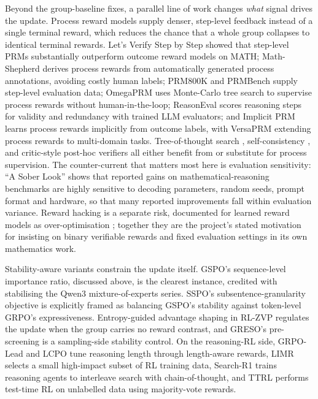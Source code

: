 \documentclass[12pt,a4paper]{report}
\begin{document}
Beyond the group-baseline fixes, a parallel line of work changes
\emph{what} signal drives the update. Process reward models supply
denser, step-level feedback instead of a single terminal reward, which
reduces the chance that a whole group collapses to identical terminal
rewards. Let's Verify Step by Step \citep{lightman2023lets} showed that
step-level PRMs substantially outperform outcome reward models on MATH;
Math-Shepherd \citep{wang2024mathshepherd} derives process rewards from
automatically generated process annotations, avoiding costly human
labels; PRM800K \citep{lightman2023lets} and PRMBench
\citep{song2025prmbench} supply step-level evaluation data; OmegaPRM
\citep{luo2024omegaprm} uses Monte-Carlo tree search to supervise
process rewards without human-in-the-loop; ReasonEval
\citep{xia2025reasoneval} scores reasoning steps for validity and
redundancy with trained LLM evaluators; and Implicit PRM
\citep{yuan2024implicitprm} learns process rewards implicitly from
outcome labels, with VersaPRM \citep{zeng2025versaprm} extending process
rewards to multi-domain tasks. Tree-of-thought search
\citep{yao2023tot}, self-consistency \citep{wang2023selfconsistency},
and critic-style post-hoc verifiers all either benefit from or
substitute for process supervision. The counter-current that matters
most here is evaluation sensitivity: ``A Sober Look''
\citep{hochlehnert2025sober} shows that reported gains on
mathematical-reasoning benchmarks are highly sensitive to decoding
parameters, random seeds, prompt format and hardware, so that many
reported improvements fall within evaluation variance. Reward hacking is
a separate risk, documented for learned reward models as
over-optimisation \citep{gao2023scaling}; together they are the
project's stated motivation for insisting on binary verifiable rewards
and fixed evaluation settings in its own mathematics work.

Stability-aware variants constrain the update itself. GSPO's
sequence-level importance ratio, discussed above, is the clearest
instance, credited with stabilising the Qwen3 mixture-of-experts series.
SSPO's subsentence-granularity objective is explicitly framed as
balancing GSPO's stability against token-level GRPO's expressiveness.
Entropy-guided advantage shaping in RL-ZVP regulates the update when the
group carries no reward contrast, and GRESO's pre-screening is a
sampling-side stability control. On the reasoning-RL side, GRPO-Lead
\citep{zhang2025grpolead} and LCPO \citep{aggarwal2025l1} tune reasoning
length through length-aware rewards, LIMR \citep{li2025limr} selects a
small high-impact subset of RL training data, Search-R1
\citep{jin2025searchr1} trains reasoning agents to interleave search
with chain-of-thought, and TTRL \citep{zuo2025ttrl} performs test-time
RL on unlabelled data using majority-vote rewards.
\end{document}
